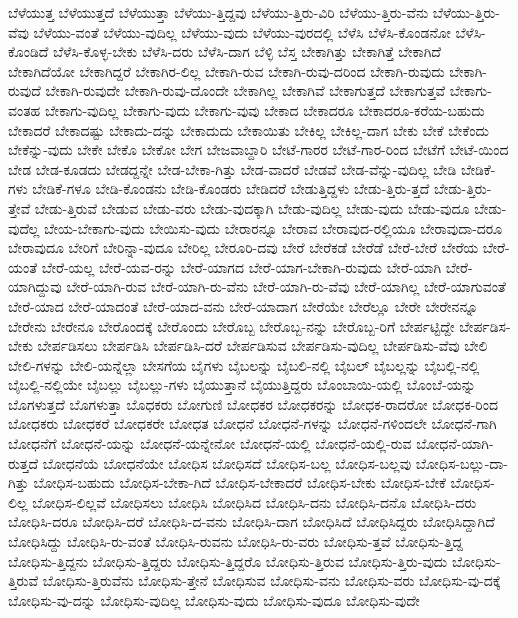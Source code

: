 {ಬೆಳೆಯುತ್ತ
ಬೆಳೆಯುತ್ತದೆ
ಬೆಳೆಯುತ್ತಾ
ಬೆಳೆಯು-ತ್ತಿದ್ದವು
ಬೆಳೆಯು-ತ್ತಿರು-ವಿರಿ
ಬೆಳೆಯು-ತ್ತಿರು-ವೆನು
ಬೆಳೆಯು-ತ್ತಿರು-ವೆವು
ಬೆಳೆಯು-ವಂತೆ
ಬೆಳೆಯು-ವುದಿಲ್ಲ
ಬೆಳೆಯು-ವುದು
ಬೆಳೆಯು-ವುರದಲ್ಲಿ
ಬೆಳೆಸಿ
ಬೆಳೆಸಿ-ಕೊಂಡನೋ
ಬೆಳೆಸಿ-ಕೊಂಡಿದೆ
ಬೆಳೆಸಿ-ಕೊಳ್ಳ-ಬೇಕು
ಬೆಳೆಸಿ-ದರು
ಬೆಳೆಸಿ-ದಾಗ
ಬೆಳ್ಳಿ
ಬೆಸ್ತ
ಬೇಕಾಗಿತ್ತು
ಬೇಕಾಗಿತ್ತೆ
ಬೇಕಾಗಿದೆ
ಬೇಕಾಗಿದೆಯೋ
ಬೇಕಾಗಿದ್ದರೆ
ಬೇಕಾಗಿರ-ಲಿಲ್ಲ
ಬೇಕಾಗಿ-ರುವ
ಬೇಕಾಗಿ-ರುವು-ದರಿಂದ
ಬೇಕಾಗಿ-ರುವುದು
ಬೇಕಾಗಿ-ರುವುದೆ
ಬೇಕಾಗಿ-ರುವುದೇ
ಬೇಕಾಗಿ-ರುವು-ದೊಂದೇ
ಬೇಕಾಗಿಲ್ಲ
ಬೇಕಾಗಿವೆ
ಬೇಕಾಗುತ್ತದೆ
ಬೇಕಾಗುತ್ತವೆ
ಬೇಕಾಗು-ವಂತಹ
ಬೇಕಾಗು-ವುದಿಲ್ಲ
ಬೇಕಾಗು-ವುದು
ಬೇಕಾಗು-ವುವು
ಬೇಕಾದ
ಬೇಕಾದರೂ
ಬೇಕಾದರೂ-ಕರೆಯ-ಬಹುದು
ಬೇಕಾದರೆ
ಬೇಕಾದಷ್ಟು
ಬೇಕಾದು-ದನ್ನು
ಬೇಕಾದುದು
ಬೇಕಾಯಿತು
ಬೇಕಿಲ್ಲ
ಬೇಕಿಲ್ಲ-ದಾಗ
ಬೇಕು
ಬೇಕೆ
ಬೇಕೆಂದು
ಬೇಕೆನ್ನು-ವುದು
ಬೇಕೇ
ಬೇಕೊ
ಬೇಕೋ
ಬೇಗ
ಬೇಜವಾಬ್ದಾರಿ
ಬೇಟೆ-ಗಾರರ
ಬೇಟೆ-ಗಾರ-ರಿಂದ
ಬೇಟೆಗೆ
ಬೇಟೆ-ಯಿಂದ
ಬೇಡ
ಬೇಡ-ಕೂಡದು
ಬೇಡದ್ದನ್ನೇ
ಬೇಡ-ಬೇಕಾ-ಗಿತ್ತು
ಬೇಡ-ವಾದರೆ
ಬೇಡವೆ
ಬೇಡ-ವೆನ್ನು-ವುದಿಲ್ಲ
ಬೇಡಿ
ಬೇಡಿಕೆ-ಗಳು
ಬೇಡಿಕೆ-ಗಳೂ
ಬೇಡಿ-ಕೊಂಡನು
ಬೇಡಿ-ಕೊಂಡರು
ಬೇಡಿದರೆ
ಬೇಡುತ್ತಿದ್ದಳು
ಬೇಡು-ತ್ತಿರು-ತ್ತದೆ
ಬೇಡು-ತ್ತಿರು-ತ್ತೇವೆ
ಬೇಡು-ತ್ತಿರುವೆ
ಬೇಡುವ
ಬೇಡು-ವರು
ಬೇಡು-ವುದಕ್ಕಾಗಿ
ಬೇಡು-ವುದಿಲ್ಲ
ಬೇಡು-ವುದು
ಬೇಡು-ವುದೂ
ಬೇಡು-ವುದೆಲ್ಲ
ಬೇಯ-ಬೇಕಾಗು-ವುದು
ಬೇಯಿಸು-ವುದು
ಬೇರಾರನ್ನೂ
ಬೇರಾವ
ಬೇರಾವುದ-ರಲ್ಲಿಯೂ
ಬೇರಾವುದಾ-ದರೂ
ಬೇರಾವುದೂ
ಬೇರಿಗೆ
ಬೇರಿನ್ನಾ-ವುದೂ
ಬೇರಿಲ್ಲ
ಬೇರೂರಿ-ದವು
ಬೇರೆ
ಬೇರೆಕಡೆ
ಬೇರೆಡೆ
ಬೇರೆ-ಬೇರೆ
ಬೇರೆಯ
ಬೇರೆ-ಯಂತೆ
ಬೇರೆ-ಯಲ್ಲ
ಬೇರೆ-ಯವ-ರನ್ನು
ಬೇರೆ-ಯಾಗದ
ಬೇರೆ-ಯಾಗ-ಬೇಕಾಗಿ-ರುವುದು
ಬೇರೆ-ಯಾಗಿ
ಬೇರೆ-ಯಾಗಿದ್ದುವು
ಬೇರೆ-ಯಾಗಿ-ರುವ
ಬೇರೆ-ಯಾಗಿ-ರು-ವೆನು
ಬೇರೆ-ಯಾಗಿ-ರು-ವೆವು
ಬೇರೆ-ಯಾಗಿಲ್ಲ
ಬೇರೆ-ಯಾಗುವಂತೆ
ಬೇರೆ-ಯಾದ
ಬೇರೆ-ಯಾದಂತೆ
ಬೇರೆ-ಯಾದ-ವನು
ಬೇರೆ-ಯಾದಾಗ
ಬೇರೆಯೇ
ಬೇರೆಲ್ಲೂ
ಬೇರೇ
ಬೇರೇನನ್ನೂ
ಬೇರೇನು
ಬೇರೇನೂ
ಬೇರೊಂದಕ್ಕೆ
ಬೇರೊಂದು
ಬೇರೊಬ್ಬ
ಬೇರೊಬ್ಬ-ನನ್ನು
ಬೇರೊಬ್ಬ-ರಿಗೆ
ಬೇರ್ಪಟ್ಟಿದ್ದೇ
ಬೇರ್ಪಡಿಸ-ಬೇಕು
ಬೇರ್ಪಡಿಸಲು
ಬೇರ್ಪಡಿಸಿ
ಬೇರ್ಪಡಿಸಿ-ದರೆ
ಬೇರ್ಪಡಿಸುವ
ಬೇರ್ಪಡಿಸು-ವುದಿಲ್ಲ
ಬೇರ್ಪಡಿಸು-ವೆವು
ಬೇಲಿ
ಬೇಲಿ-ಗಳನ್ನು
ಬೇಲಿ-ಯನ್ನೆಲ್ಲಾ
ಬೇಸಗೆಯ
ಬೈಗಳು
ಬೈಬಲನ್ನು
ಬೈಬಲಿ-ನಲ್ಲಿ
ಬೈಬಲ್
ಬೈಬಲ್ಲನ್ನು
ಬೈಬಲ್ಲಿ-ನಲ್ಲಿ
ಬೈಬಲ್ಲಿ-ನಲ್ಲಿಯೇ
ಬೈಬಲ್ಲು
ಬೈಬಲ್ಲು-ಗಳು
ಬೈಯುತ್ತಾನೆ
ಬೈಯುತ್ತಿದ್ದರು
ಬೊಂಬಾಯಿ-ಯಲ್ಲಿ
ಬೊಂಬೆ-ಯನ್ನು
ಬೊಗಳುತ್ತದೆ
ಬೊಗಳುತ್ತಾ
ಬೊಧಕರು
ಬೋಗುಣಿ
ಬೋಧಕರ
ಬೋಧಕರನ್ನು
ಬೋಧಕ-ರಾದರೋ
ಬೋಧಕ-ರಿಂದ
ಬೋಧಕರು
ಬೋಧಕರೆ
ಬೋಧಕರೇ
ಬೋಧತ
ಬೋಧನೆ
ಬೋಧನೆ-ಗಳನ್ನು
ಬೋಧನೆ-ಗಳಿಂದಲೇ
ಬೋಧನೆ-ಗಾಗಿ
ಬೋಧನೆಗೆ
ಬೋಧನೆ-ಯನ್ನು
ಬೋಧನೆ-ಯನ್ನೇನೋ
ಬೋಧನೆ-ಯಲ್ಲಿ
ಬೋಧನೆ-ಯಲ್ಲಿ-ರುವ
ಬೋಧನೆ-ಯಾಗಿ-ರುತ್ತದೆ
ಬೋಧನೆಯೆ
ಬೋಧನೆಯೇ
ಬೋಧಿಸ
ಬೋಧಿಸದೆ
ಬೋಧಿಸ-ಬಲ್ಲ
ಬೋಧಿಸ-ಬಲ್ಲವು
ಬೋಧಿಸ-ಬಲ್ಲು-ದಾ-ಗಿತ್ತು
ಬೋಧಿಸ-ಬಹುದು
ಬೋಧಿಸ-ಬೇಕಾ-ಗಿದೆ
ಬೋಧಿಸ-ಬೇಕಾದರೆ
ಬೋಧಿಸ-ಬೇಕು
ಬೋಧಿಸ-ಬೇಕೆ
ಬೋಧಿಸ-ಲಿಲ್ಲ
ಬೋಧಿಸ-ಲಿಲ್ಲವೆ
ಬೋಧಿಸಲು
ಬೋಧಿಸಿ
ಬೋಧಿಸಿದ
ಬೋಧಿಸಿ-ದನು
ಬೋಧಿಸಿ-ದನೊ
ಬೋಧಿಸಿ-ದರು
ಬೋಧಿಸಿ-ದರೂ
ಬೋಧಿಸಿ-ದರೆ
ಬೋಧಿಸಿ-ದ-ವನು
ಬೋಧಿಸಿ-ದಾಗ
ಬೋಧಿಸಿದೆ
ಬೋಧಿಸಿದ್ದರು
ಬೋಧಿಸಿದ್ದಾಗಿದೆ
ಬೋಧಿಸಿದ್ದು
ಬೋಧಿಸಿ-ರು-ವಂತೆ
ಬೋಧಿಸಿ-ರುವನು
ಬೋಧಿಸಿ-ರು-ವರು
ಬೋಧಿಸು-ತ್ತವೆ
ಬೋಧಿಸು-ತ್ತಿದ್ದ
ಬೋಧಿಸು-ತ್ತಿದ್ದನು
ಬೋಧಿಸು-ತ್ತಿದ್ದರು
ಬೋಧಿಸು-ತ್ತಿದ್ದರೊ
ಬೋಧಿಸು-ತ್ತಿರುವ
ಬೋಧಿಸು-ತ್ತಿರು-ವುದು
ಬೋಧಿಸು-ತ್ತಿರುವೆ
ಬೋಧಿಸು-ತ್ತಿರುವೆನು
ಬೋಧಿಸು-ತ್ತೇನೆ
ಬೋಧಿಸುವ
ಬೋಧಿಸು-ವನು
ಬೋಧಿಸು-ವರು
ಬೋಧಿಸು-ವು-ದಕ್ಕೆ
ಬೋಧಿಸು-ವು-ದನ್ನು
ಬೋಧಿಸು-ವುದಿಲ್ಲ
ಬೋಧಿಸು-ವುದು
ಬೋಧಿಸು-ವುದೂ
ಬೋಧಿಸು-ವುದೇ
}
